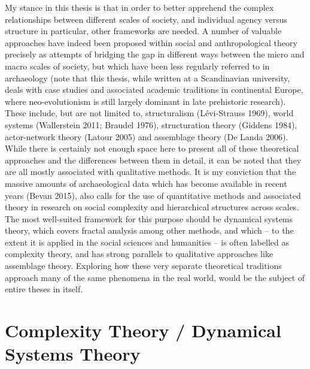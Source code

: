 \documentclass[
  12pt,
  a4paper, twoside]{book}
\begin{document}
My stance in this thesis is that in order to better apprehend the complex relationships between different scales of society, and individual agency versus structure in particular, other frameworks are needed. A number of valuable approaches have indeed been proposed within social and anthropological theory precisely as attempts of bridging the gap in different ways between the micro and macro scales of society, but which have been less regularly referred to in archaeology (note that this thesis, while written at a Scandinavian university, deals with case studies and associated academic traditions in continental Europe, where neo-evolutionism is still largely dominant in late prehistoric research). These include, but are not limited to, structuralism (Lévi-Strauss 1969), world systems (Wallerstein 2011; Braudel 1976), structuration theory (Giddens 1984), actor-network theory (Latour 2005) and assemblage theory (De Landa 2006). While there is certainly not enough space here to present all of these theoretical approaches and the differences between them in detail, it can be noted that they are all mostly associated with qualitative methods. It is my conviction that the massive amounts of archaeological data which has become available in recent years (Bevan 2015), also calls for the use of quantitative methods and associated theory in research on social complexity and hierarchical structures across scales. The most well-suited framework for this purpose should be dynamical systems theory, which covers fractal analysis among other methods, and which -- to the extent it is applied in the social sciences and humanities -- is often labelled as complexity theory, and has strong parallels to qualitative approaches like assemblage theory. Exploring how these very separate theoretical traditions approach many of the same phenomena in the real world, would be the subject of entire theses in itself.

\hypertarget{complexity}{%
\section{Complexity Theory / Dynamical Systems Theory}\label{complexity}}
\end{document}
